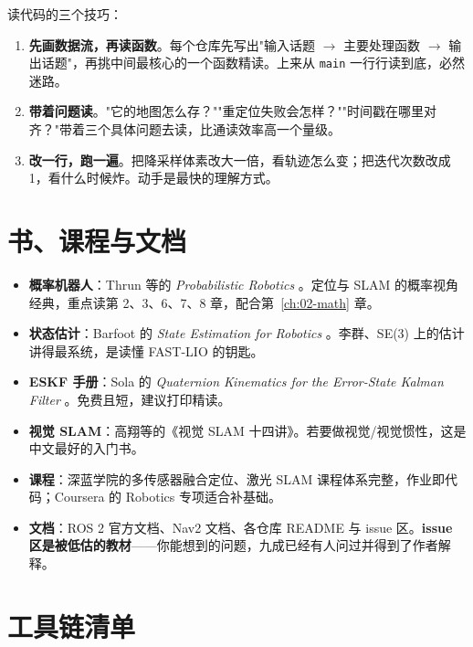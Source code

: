 读代码的三个技巧：

\begin{enumerate}
  \item \textbf{先画数据流，再读函数}。每个仓库先写出"输入话题 $\to$ 主要处理函数 $\to$ 输出话题"，再挑中间最核心的一个函数精读。上来从 \lstinline{main} 一行行读到底，必然迷路。
  \item \textbf{带着问题读}。"它的地图怎么存？""重定位失败会怎样？""时间戳在哪里对齐？"带着三个具体问题去读，比通读效率高一个量级。
  \item \textbf{改一行，跑一遍}。把降采样体素改大一倍，看轨迹怎么变；把迭代次数改成 1，看什么时候炸。动手是最快的理解方式。
\end{enumerate}

\section{书、课程与文档}\label{sec:30-books}

\begin{itemize}
  \item \textbf{概率机器人}：Thrun 等的 \emph{Probabilistic Robotics} \cite{thrun2005probabilistic}。定位与 SLAM 的概率视角经典，重点读第 2、3、6、7、8 章，配合第~\ref{ch:02-math} 章。
  \item \textbf{状态估计}：Barfoot 的 \emph{State Estimation for Robotics} \cite{barfoot2017state}。李群、SE(3) 上的估计讲得最系统，是读懂 FAST-LIO 的钥匙。
  \item \textbf{ESKF 手册}：Sola 的 \emph{Quaternion Kinematics for the Error-State Kalman Filter} \cite{sola2017eskf}。免费且短，建议打印精读。
  \item \textbf{视觉 SLAM}：高翔等的《视觉 SLAM 十四讲》。若要做视觉/视觉惯性，这是中文最好的入门书。
  \item \textbf{课程}：深蓝学院的多传感器融合定位、激光 SLAM 课程体系完整，作业即代码；Coursera 的 Robotics 专项适合补基础。
  \item \textbf{文档}：ROS 2 官方文档、Nav2 文档、各仓库 README 与 issue 区。\textbf{issue 区是被低估的教材}——你能想到的问题，九成已经有人问过并得到了作者解释。
\end{itemize}

\section{工具链清单}\label{sec:30-tools}

